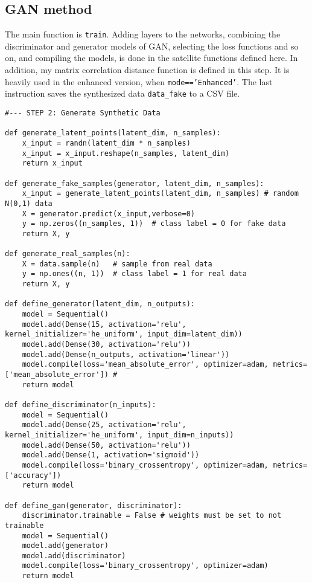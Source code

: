 \documentclass[oneside,10pt]{book}
\begin{document}
\subsection{GAN method}\label{xcxxsdzs}\label{maindqq}

The main function is \texttt{train}. Adding layers to the networks, combining the discriminator and generator models of GAN, selecting
 the loss functions and so on, and compiling the models, is done in the satellite functions defined here.
In addition, my matrix correlation distance function is defined in this step. It is heavily used in the enhanced version, when
 \texttt{mode=='Enhanced'}. The last instruction saves the synthesized data \texttt{data\_fake} to a CSV file.\vspace{1ex}


\begin{lstlisting}
#--- STEP 2: Generate Synthetic Data

def generate_latent_points(latent_dim, n_samples):
    x_input = randn(latent_dim * n_samples)
    x_input = x_input.reshape(n_samples, latent_dim)
    return x_input

def generate_fake_samples(generator, latent_dim, n_samples):
    x_input = generate_latent_points(latent_dim, n_samples) # random N(0,1) data
    X = generator.predict(x_input,verbose=0)
    y = np.zeros((n_samples, 1))  # class label = 0 for fake data
    return X, y

def generate_real_samples(n):
    X = data.sample(n)   # sample from real data
    y = np.ones((n, 1))  # class label = 1 for real data
    return X, y

def define_generator(latent_dim, n_outputs):
    model = Sequential()
    model.add(Dense(15, activation='relu',  kernel_initializer='he_uniform', input_dim=latent_dim))
    model.add(Dense(30, activation='relu'))
    model.add(Dense(n_outputs, activation='linear'))
    model.compile(loss='mean_absolute_error', optimizer=adam, metrics=['mean_absolute_error']) #
    return model

def define_discriminator(n_inputs):
    model = Sequential()
    model.add(Dense(25, activation='relu', kernel_initializer='he_uniform', input_dim=n_inputs))
    model.add(Dense(50, activation='relu'))
    model.add(Dense(1, activation='sigmoid'))
    model.compile(loss='binary_crossentropy', optimizer=adam, metrics=['accuracy'])
    return model

def define_gan(generator, discriminator):
    discriminator.trainable = False # weights must be set to not trainable
    model = Sequential()
    model.add(generator)
    model.add(discriminator)
    model.compile(loss='binary_crossentropy', optimizer=adam)
    return model


\end{lstlisting}
\end{document}
